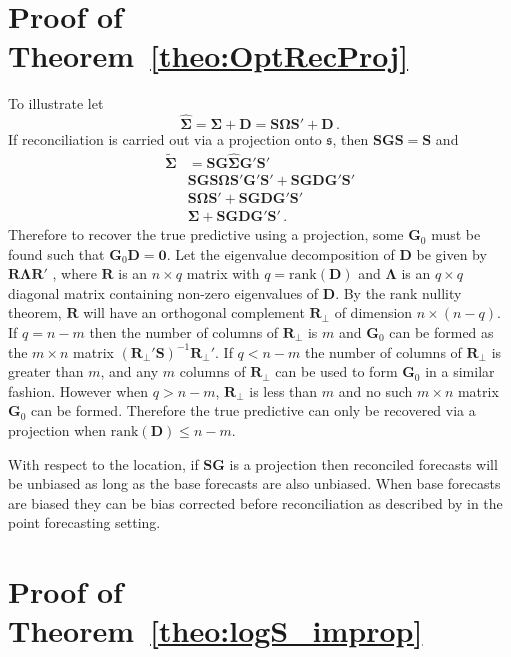 \documentclass[12pt]{article}
\theoremstyle{definition}
\begin{document}
\section{Proof of Theorem~\ref{theo:OptRecProj}}
\label{app:OptRecProj}

To illustrate let
\[
\hat{\bm{\Sigma}}=\bm{\Sigma}+{\bm D}=\bm{S}\bm{\Omega}{\bm{S}}'+{\bm D}\,.
\]
If reconciliation is carried out via a projection onto $\mathfrak{s}$, then $\bm{S}\bm{G}\bm{S}=\bm{S}$ and
\begin{align}
\tilde{\bm{\Sigma}}&=\bm{S}\bm{G}\hat{\bm{\Sigma}}\bm{G}'\bm{S}'\nonumber\\
&\bm{S}\bm{G}\bm{S}\bm{\Omega}\bm{S}'\bm{G}'{\bm{S}}'+\bm{S}\bm{G}{\bm D}\bm{G}'\bm{S}'\nonumber\\
&\bm{S}\bm{\Omega}{\bm{S}}'+\bm{S}\bm{G}{\bm D}\bm{G}'\bm{S}'\nonumber\\
&\bm{\Sigma}+\bm{S}\bm{G}{\bm D}\bm{G}'\bm{S}'\nonumber\,.
\end{align}
Therefore to recover the true predictive using a projection, some ${\bm G}_0$ must be found such that ${\bm G}_0{\bm D}=\bm{0}$. Let the eigenvalue decomposition of $\bm {D}$ be given by  ${\bm R}{\bm \Lambda}{\bm R}'$ , where ${\bm R}$ is an $n\times q$ matrix with $q=\textrm{rank}({\bm{D}})$ and ${\bm\Lambda}$ is an $q\times q$ diagonal matrix containing non-zero eigenvalues of ${\bm D}$.  By the rank nullity theorem, $\bm{R}$ will have an orthogonal complement $\bm{R}_{\perp}$ of dimension $n\times (n-q)$.  If $q=n-m$ then the number of columns of $\bm{R}_{\perp}$ is $m$ and ${\bm G}_0$ can be formed as the $m\times n$ matrix $(\bm{R}_{\perp}'\bm{S})^{-1}\bm{R}_{\perp}'$.  If $q<n-m$ the number of columns of $\bm{R}_{\perp}$ is greater than $m$, and any $m$ columns of $\bm{R}_{\perp}$ can be used to form ${\bm G}_0$ in a similar fashion.  However when $q>n-m$, $\bm{R}_{\perp}$ is less than $m$ and no such $m\times n$ matrix ${\bm G}_0$ can be formed.  Therefore the true predictive can only be recovered via a projection when $\textrm{rank}({\bm D})\leq n-m$.

With respect to the location, if $\bm{SG}$ is a projection then reconciled forecasts will be unbiased as long as the base forecasts are also unbiased.  When base forecasts are biased they can be bias corrected before reconciliation as described by \cite{PanEtAl2019HF} in the point forecasting setting.

\clearpage
\section{Proof of Theorem~\ref{theo:logS_improp}}\label{app:logS_improp}
\end{document}
